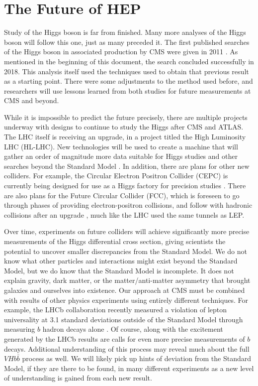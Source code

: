 \section{The Future of HEP}

Study of the Higgs boson is far from finished.
Many more analyses of the Higgs boson will follow this one, just as many preceded it.
The first published searches of the Higgs boson in associated production by CMS
were given in 2011 \cite{CMS-PAS-HIG-11-012}.
As mentioned in the beginning of this document, the search concluded successfully in 2018.
This analysis itself used the techniques used to obtain that previous result as a starting point.
There were some adjustments to the method used before, and
researchers will use lessons learned from both studies for future measurements at CMS and beyond.

While it is impossible to predict the future precisely,
there are multiple projects underway with designs to continue to study the Higgs after CMS and ATLAS.
The LHC itself is receiving an upgrade, in a project titled the High Luminosity LHC (HL-LHC).
New technologies will be used to create a machine that will gather
an order of magnitude more data suitable for Higgs studies and
other searches beyond the Standard Model \cite{osti_1365580}.
In addition, there are plans for other new colliders.
For example, the Circular Electron Positron Collider (CEPC) is currently being designed
for use as a Higgs factory for precision studies \cite{thecepcstudygroup2018cepc}.
There are also plans for the Future Circular Collider (FCC),
which is foreseen to go through phases of providing electron-positron collisions,
and follow with hadronic collisions after an upgrade \cite{benedikt2020future},
much like the LHC used the same tunnels as LEP.

Over time, experiments on future colliders will achieve significantly more precise measurements
of the Higgs differential cross section,
giving scientists the potential to uncover smaller discrepancies from the Standard Model.
We do not know what other particles and interactions might exist beyond the Standard Model,
but we do know that the Standard Model is incomplete.
It does not explain gravity, dark matter, or
the matter/anti-matter asymmetry that brought galaxies and ourselves into existence.
Our approach at CMS must be combined with results of other physics experiments using entirely different techniques.
For example, the LHCb collaboration recently measured a violation of lepton universality
at 3.1 standard deviations outside of the Standard Model through measuring $b$ hadron decays alone
\cite{lhcbcollaboration2021test}.
Of course, along with the excitement generated by the LHCb results are calls for
even more precise measurements of $b$ decays.
Additional understanding of this process may reveal much about the full $V\!Hb\bar{b}$ process as well.
We will likely pick up hints of deviation from the Standard Model, if they are there to be found,
in many different experiments as a new level of understanding is gained from each new result.
